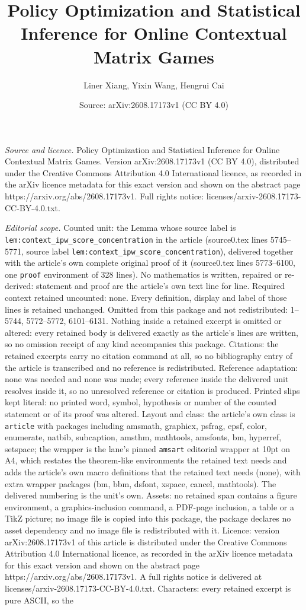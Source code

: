 \documentclass[10pt,a4paper]{amsart}
\title[Policy Optimization and Statistical Inference for Online Con]{Policy Optimization and Statistical Inference for Online Contextual Matrix Games}
\author{Liner Xiang, Yixin Wang, Hengrui Cai}
\date{Source: arXiv:2608.17173v1 (CC BY 4.0)}
\begin{document}
\maketitle

\noindent\emph{Source and licence.} Policy Optimization and Statistical Inference for Online Contextual Matrix Games. Version arXiv:2608.17173v1 (CC BY 4.0), distributed under the Creative Commons Attribution 4.0 International licence, as recorded in the arXiv licence metadata for this exact version and shown on the abstract page https://arxiv.org/abs/2608.17173v1. Full rights notice: licenses/arxiv-2608.17173-CC-BY-4.0.txt.\par\smallskip

\noindent\textit{Editorial scope.} Counted unit: the Lemma whose source label is \texttt{lem:context\_ipw\_score\_concentration} in the article (source0.tex lines 5745--5771, source label \texttt{lem:context\_ipw\_score\_concentration}), delivered together with the article's own complete original proof of it (source0.tex lines 5773--6100, one \texttt{proof} environment of 328 lines). No mathematics is written, repaired or re-derived: statement and proof are the article's own text line for line. Required context retained uncounted: none. Every definition, display and label of those lines is retained unchanged. Omitted from this package and not redistributed: 1--5744, 5772--5772, 6101--6131. Nothing inside a retained excerpt is omitted or altered: every retained body is delivered exactly as the article's lines are written, so no omission receipt of any kind accompanies this package. Citations: the retained excerpts carry no citation command at all, so no bibliography entry of the article is transcribed and no reference is redistributed. Reference adaptation: none was needed and none was made; every reference inside the delivered unit resolves inside it, so no unresolved reference or citation is produced. Printed slips kept literal: no printed word, symbol, hypothesis or number of the counted statement or of its proof was altered. Layout and class: the article's own class is \texttt{article} with packages including amsmath, graphicx, psfrag, epsf, color, enumerate, natbib, subcaption, amsthm, mathtools, amsfonts, bm, hyperref, setspace; the wrapper is the lane's pinned \texttt{amsart} editorial wrapper at 10pt on A4, which restates the theorem-like environments the retained text needs and adds the article's own macro definitions that the retained text needs (none), with extra wrapper packages (bm, bbm, dsfont, xspace, cancel, mathtools). The delivered numbering is the unit's own. Assets: no retained span contains a figure environment, a graphics-inclusion command, a PDF-page inclusion, a table or a TikZ picture; no image file is copied into this package, the package declares no asset dependency and no image file is redistributed with it. Licence: version arXiv:2608.17173v1 of this article is distributed under the Creative Commons Attribution 4.0 International licence, as recorded in the arXiv licence metadata for this exact version and shown on the abstract page https://arxiv.org/abs/2608.17173v1. A full rights notice is delivered at licenses/arxiv-2608.17173-CC-BY-4.0.txt. Characters: every retained excerpt is pure ASCII, so the 
\end{document}
